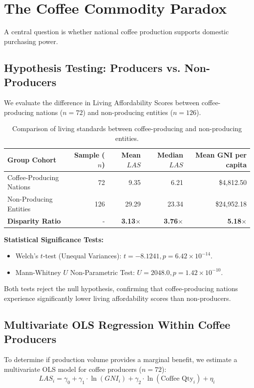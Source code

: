 \documentclass[11pt,a4paper]{article}
\begin{document}
\section{The Coffee Commodity Paradox}

A central question is whether national coffee production supports domestic purchasing power.

\subsection{Hypothesis Testing: Producers vs. Non-Producers}
We evaluate the difference in Living Affordability Scores between coffee-producing nations ($n=72$) and non-producing entities ($n=126$).

\begin{table}[h]
\centering
\small
\begin{tabular}{@{}lrrrr@{}}
\toprule
\textbf{Group Cohort} & \textbf{Sample ($n$)} & \textbf{Mean $LAS$} & \textbf{Median $LAS$} & \textbf{Mean GNI per capita} \\
\midrule
Coffee-Producing Nations & 72 & 9.35 & 6.21 & \$4,812.50 \\
Non-Producing Entities & 126 & 29.29 & 23.34 & \$24,952.18 \\
\midrule
\textbf{Disparity Ratio} & - & \textbf{3.13$\times$} & \textbf{3.76$\times$} & \textbf{5.18$\times$} \\
\bottomrule
\end{tabular}
\caption{Comparison of living standards between coffee-producing and non-producing entities.}
\label{tab:coffee_hypothesis}
\end{table}

\textbf{Statistical Significance Tests:}
\begin{itemize}[leftmargin=1.5em]
    \item Welch's $t$-test (Unequal Variances): $t = -8.1241, p = 6.42 \times 10^{-14}$.
    \item Mann-Whitney $U$ Non-Parametric Test: $U = 2048.0, p = 1.42 \times 10^{-10}$.
\end{itemize}
Both tests reject the null hypothesis, confirming that coffee-producing nations experience significantly lower living affordability scores than non-producers.

\subsection{Multivariate OLS Regression Within Coffee Producers}
To determine if production volume provides a marginal benefit, we estimate a multivariate OLS model for coffee producers ($n=72$):
\begin{equation}
LAS_i = \gamma_0 + \gamma_1 \cdot \ln(GNI_i) + \gamma_2 \cdot \ln(\text{Coffee Qty}_i) + \eta_i
\end{equation}
\end{document}

